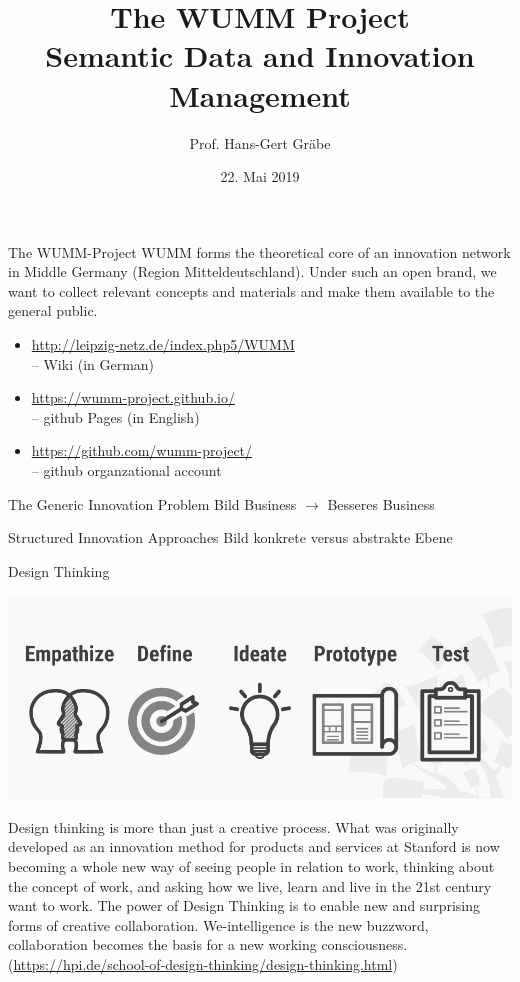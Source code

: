 \documentclass[11pt]{beamer}
\title[The WUMM Project]{The WUMM Project\\ Semantic Data and Innovation
  Management}
\author[Hans-Gert Gr\"abe]{Prof. Hans-Gert Gräbe}
\institute{Institut f\"ur Informatik, Universit\"at Leipzig,\\
  \url{http://bis.informatik.uni-leipzig.de/HansGertGraebe/}}
\date{22. Mai 2019}
\begin{document}
\begin{frame}
\maketitle
\end{frame}

\begin{frame}{The WUMM-Project}
  WUMM forms the theoretical core of an innovation network in Middle Germany
  (Region Mitteldeutschland). Under such an open brand, we want to collect
  relevant concepts and materials and make them available to the general
  public.
  \begin{itemize}
  \item \url{http://leipzig-netz.de/index.php5/WUMM}\\ -- Wiki (in German)
  \item \url{https://wumm-project.github.io/}\\ -- github Pages (in English)
  \item \url{https://github.com/wumm-project/}\\ -- github organzational
    account
  \end{itemize}
\end{frame}


\begin{frame}{The Generic Innovation Problem}
Bild Business $\to$ Besseres Business

\end{frame}

\begin{frame}{Structured Innovation Approaches}
Bild konkrete versus abstrakte Ebene
\end{frame}

\begin{frame}{Design Thinking}
  \begin{center}
    \includegraphics[width=.7\textwidth]{DesignThinking.jpg}
  \end{center}\scriptsize
    Design thinking is more than just a creative process. What was originally
    developed as an innovation method for products and services at Stanford is
    now becoming a whole new way of seeing people in relation to work,
    thinking about the concept of work, and asking how we live, learn and live
    in the 21st century want to work. The power of Design Thinking is to
    enable new and surprising forms of creative collaboration. We-intelligence
    is the new buzzword, collaboration becomes the basis for a new working
    consciousness.
    (\url{https://hpi.de/school-of-design-thinking/design-thinking.html})
\end{frame}
\end{document}
